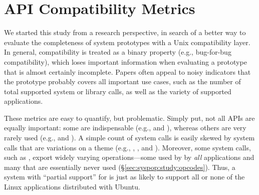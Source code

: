 \section{API Compatibility Metrics}
\label{sec:syspop:measure}

We started this study from a research perspective, in search of a better way to evaluate
the completeness of system prototypes with a Unix compatibility layer.
In general, compatibility is treated as a binary property
(e.g., bug-for-bug compatibility), which loses 
important information when evaluating a prototype that is almost certainly incomplete.
Papers often appeal to noisy indicators that the prototype probably covers all important use cases,
such as the number of total supported system or library calls, as well as the variety
of supported applications.


These metrics are easy to quantify, but problematic.
Simply put, not all APIs are equally important: some are indispensable (e.g.,  and ),
whereas others are very rarely used (e.g.,  and ).
A simple count of system calls is easily skewed by 
system calls that are variations on a theme (e.g., , , and ).
Moreover, some system calls, such as ,
export widely varying operations---some used by 
by {\em all} applications and many that are essentially never used (\S\ref{sec:syspop:study:opcodes}).
Thus, a system with ``partial support'' for 
is just as likely to support all or none of the Linux applications distributed with Ubuntu.





